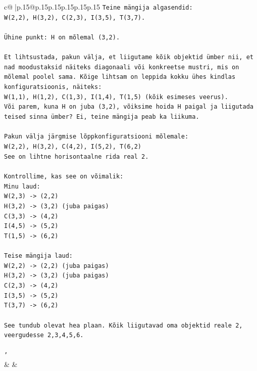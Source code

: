 \documentclass{article}
\begin{document}
{\begin{supertabular}{c@{$\;$}|p{.15\linewidth}@{}p{.15\linewidth}p{.15\linewidth}p{.15\linewidth}p{.15\linewidth}p{.15\linewidth}}
{{{\texttt{Teine mängija algasendid:} \\
\texttt{W(2,2), H(3,2), C(2,3), I(3,5), T(3,7).} \\
\\ 
\texttt{Ühine punkt: H on mõlemal (3,2).} \\
\\ 
\texttt{Et lihtsustada, pakun välja, et liigutame kõik objektid ümber nii, et nad moodustaksid näiteks diagonaali või konkreetse mustri, mis on mõlemal poolel sama. Kõige lihtsam on leppida kokku ühes kindlas konfiguratsioonis, näiteks:} \\
\texttt{W(1,1), H(1,2), C(1,3), I(1,4), T(1,5) (kõik esimeses veerus).} \\
\texttt{Või parem, kuna H on juba (3,2), võiksime hoida H paigal ja liigutada teised sinna ümber? Ei, teine mängija peab ka liikuma.} \\
\\ 
\texttt{Pakun välja järgmise lõppkonfiguratsiooni mõlemale:} \\
\texttt{W(2,2), H(3,2), C(4,2), I(5,2), T(6,2)} \\
\texttt{See on lihtne horisontaalne rida real 2.} \\
\\ 
\texttt{Kontrollime, kas see on võimalik:} \\
\texttt{Minu laud:} \\
\texttt{W(2,3) {-}> (2,2)} \\
\texttt{H(3,2) {-}> (3,2) (juba paigas)} \\
\texttt{C(3,3) {-}> (4,2)} \\
\texttt{I(4,5) {-}> (5,2)} \\
\texttt{T(1,5) {-}> (6,2)} \\
\\ 
\texttt{Teise mängija laud:} \\
\texttt{W(2,2) {-}> (2,2) (juba paigas)} \\
\texttt{H(3,2) {-}> (3,2) (juba paigas)} \\
\texttt{C(2,3) {-}> (4,2)} \\
\texttt{I(3,5) {-}> (5,2)} \\
\texttt{T(3,7) {-}> (6,2)} \\
\\ 
\texttt{See tundub olevat hea plaan. Kõik liigutavad oma objektid reale 2, veergudesse 2,3,4,5,6.} \\
\\ 
\texttt{'} \\
            }
        }
    }
    & & \\ \\


\end{supertabular}}
\end{document}
